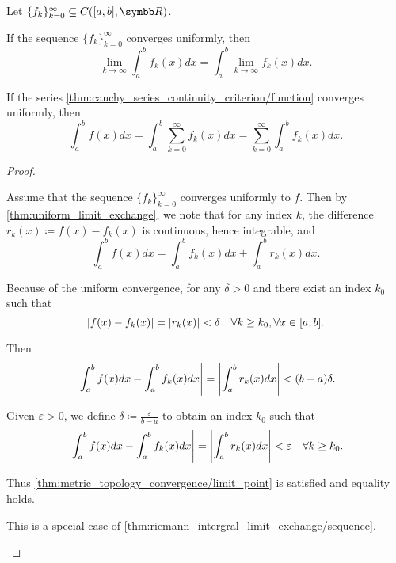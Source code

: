 \begin{corollary}\label{thm:riemann_intergral_limit_exchange}\cite[]{Фихтенгольц1968/2}
  Let \( \{ f_k \}_{k=0}^\infty \subseteq C([a, b], \R) \).

  \begin{thmenum}
     If the sequence \( \{ f_k \}_{k=0}^\infty \) converges uniformly, then
    \begin{equation*}
      \lim_{k \to \infty} \int_a^b f_k(x) dx = \int_a^b \lim_{k \to \infty} f_k(x) dx.
    \end{equation*}

     If the series \cref{thm:cauchy_series_continuity_criterion/function} converges uniformly, then
    \begin{equation*}
      \int_a^b f(x) dx = \int_a^b \sum_{k=0}^\infty f_k(x) dx = \sum_{k=0}^\infty \int_a^b f_k(x) dx.
    \end{equation*}
  \end{thmenum}
\end{corollary}
\begin{proof}
  \begin{description}
     Assume that the sequence \( \{ f_k \}_{k=0}^\infty \) converges uniformly to \( f \). Then by \cref{thm:uniform_limit_exchange}, we note that for any index \( k \), the difference \( r_k(x) \coloneqq f(x) - f_k(x) \) is continuous, hence integrable, and
    \begin{equation*}
      \int_a^b f(x) dx = \int_a^b f_k(x) dx + \int_a^b r_k(x) dx.
    \end{equation*}

    Because of the uniform convergence, for any \( \delta > 0 \) and there exist an index \( k_0 \) such that
    \begin{equation*}
      \left\vert f(x) - f_k(x) \right\vert = \left\vert r_k(x) \right\vert < \delta \quad\forall k \geq k_0, \forall x \in [a, b].
    \end{equation*}

    Then
    \begin{equation*}
      \left\vert \int_a^b f(x) dx - \int_a^b f_k(x) dx \right\vert = \left\vert \int_a^b r_k(x) dx \right\vert < (b - a) \delta.
    \end{equation*}

    Given \( \varepsilon > 0 \), we define \( \delta \coloneqq \frac \varepsilon {b - a} \) to obtain an index \( k_0 \) such that
    \begin{equation*}
      \left\vert \int_a^b f(x) dx - \int_a^b f_k(x) dx \right\vert = \left\vert \int_a^b r_k(x) dx \right\vert < \varepsilon \quad\forall k \geq k_0.
    \end{equation*}

    Thus \cref{thm:metric_topology_convergence/limit_point} is satisfied and equality holds.

     This is a special case of \cref{thm:riemann_intergral_limit_exchange/sequence}.
  \end{description}
\end{proof}

